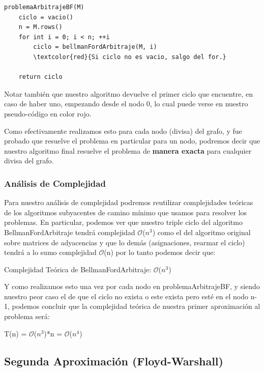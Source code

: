 \documentclass[11pt,a4paper]{article}
\begin{document}
\begin{Verbatim}[commandchars=\\\{\}]
problemaArbitrajeBF(M)
    ciclo = vacio()
    n = M.rows()
    for int i = 0; i < n; ++i 
        ciclo = bellmanFordArbitraje(M, i)
        \textcolor{red}{Si ciclo no es vacio, salgo del for.}
            
    return ciclo
\end{Verbatim}

Notar tambi\'en que nuestro algoritmo devuelve el primer ciclo que encuentre, en caso de haber uno, empezando desde el nodo 0, lo cual puede verse en nuestro pseudo-c\'odigo en color rojo.

Como efectivamente realizamos esto para cada nodo (divisa) del grafo, y fue probado que resuelve el problema en particular para un nodo, podremos decir que nuestro algoritmo final resuelve el problema de \textbf{manera exacta} para cualquier divisa del grafo.

\subsubsection{An\'alisis de Complejidad}
Para nuestro an\'alisis de complejidad podremos reutilizar complejidades te\'oricas de los algoritmos subyacentes de camino m\'inimo que usamos para resolver los problemas. En particular, podemos ver que nuestro triple ciclo del algoritmo BellmanFordArbitraje tendr\'a complejidad $\mathcal{O}$($n^{3}$) como el del algoritmo original sobre matrices de adyacencias y que lo dem\'as (asignaciones, rearmar el ciclo) tendr\'a a lo sumo complejidad $\mathcal{O}$(n) por lo tanto podemos decir que:
\begin{center}
Complejidad Te\'orica de BellmanFordArbitraje: $\mathcal{O}$($n^{3}$)
\end{center}

Y como realizamos esto una vez por cada nodo en problemaArbitrajeBF, y siendo nuestro peor caso el de que el ciclo no exista o este exista pero est\'e en el nodo n-1, podemos concluir que la complejidad te\'orica de nuestra primer aproximaci\'on al problema ser\'a:
\begin{center}
T(n) = $\mathcal{O}$($n^{3}$)*n = $\mathcal{O}$($n^{4}$)
\end{center}

\subsection{Segunda Aproximaci\'on (Floyd-Warshall)}
\end{document}

